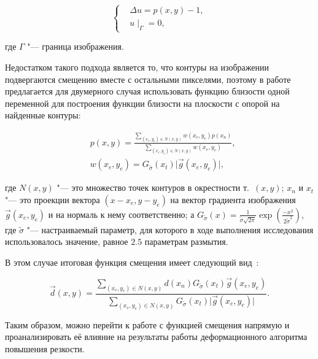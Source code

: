 \begin{equation*}
	\left\{
		\begin{aligned}
			&\Delta u = p\left(x,y\right) - 1, \\
			&u\mid_\Gamma=0,
		\end{aligned}
	\right.
\end{equation*}

\noindent где $\Gamma$ "--- граница изображения.

Недостатком такого подхода является то, что контуры на изображении подвергаются смещению вместе с остальными пикселями, поэтому в работе~\cite{gusev2016parallel} предлагается для двумерного случая использовать функцию близости одной переменной для построения функции близости на плоскости с опорой на найденные контуры:

\begin{align*}
	&p\left(x,y\right) = \frac{\sum_{\left(x_e,y_e\right) \in N\left(x,y\right)}{w\left(x_e,y_e\right)p\left(x_n\right)}} {\sum_{\left(x_e,y_e\right) \in N\left(x,y\right)}{w\left(x_e,y_e\right)}}, \\
	&w\left(x_e,y_e\right) = G_{\widetilde{\sigma}}\left(x_t\right)\lvert \vec{g}\left(x_e,y_e\right) \rvert,
\end{align*}

\noindent где $N\left(x,y\right)$ "--- это множество точек контуров в окрестности т.~$\left(x, y\right)$; $x_n$ и $x_t$ "--- это проекции вектора $\left(x-x_e, y-y_e\right)$ на вектор градиента изображения $\vec{g}\left(x_e,y_e\right)$ и на нормаль к нему соответственно; а $G_{\widetilde{\sigma}}\left(x\right) = \frac{1}{\widetilde{\sigma} \sqrt{2\pi}} \exp\left(\frac{-x^2}{2\widetilde{\sigma}^2}\right)$, где $\widetilde{\sigma}$ "--- настраиваемый параметр, для которого в ходе выполнения исследования использовалось значение, равное $2.5$ параметрам размытия.

В этом случае итоговая функция смещения имеет следующий вид~\cite{gusev2016parallel}:

\begin{equation*}
	\vec{d}\left(x,y\right) = \frac{\sum_{\left(x_e,y_e\right) \in N\left(x,y\right)}{d\left(x_n\right) G_{\widetilde{\sigma}}\left(x_t\right) \vec{g}\left(x_e,y_e\right) }} {\sum_{\left(x_e,y_e\right) \in N\left(x,y\right)}{G_{\widetilde{\sigma}}\left(x_t\right)\lvert \vec{g}\left(x_e,y_e\right) \rvert}}.
\end{equation*}

Таким образом, можно перейти к работе с функцией смещения напрямую и проанализировать её влияние на результаты работы деформационного алгоритма повышения резкости.

